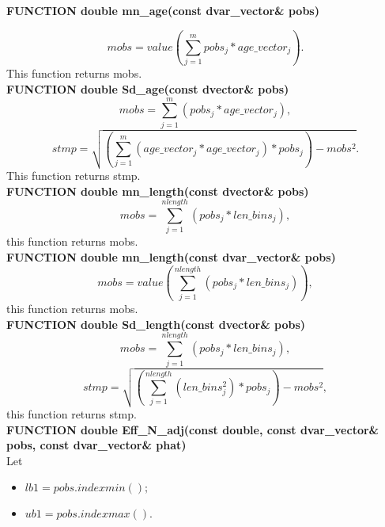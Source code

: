 \documentclass{article}
\begin{document}
\textbf{FUNCTION double mn\_age(const dvar\_vector\& pobs)}

\begin{equation}
    mobs = value\left(\sum_{j=1}^m pobs_j*age\_vector_j\right).
\end{equation}
This function returns mobs.\\

\textbf{FUNCTION double Sd\_age(const dvector\& pobs)}\\
\begin{equation}
    mobs = \sum_{j=1}^m(pobs_j*age\_vector_j),
\end{equation}
\begin{equation}
    stmp = \sqrt{\left(\sum_{j=1}^m(age\_vector_j*age\_vector_j)*pobs_j\right) - mobs^2}.
\end{equation}
This function returns stmp.\\
\textbf{FUNCTION double mn\_length(const dvector\& pobs)}\\
\begin{equation}
    mobs = \sum_{j=1}^{nlength}(pobs_j*len\_bins_j),
\end{equation}
this function returns mobs.\\
\textbf{FUNCTION double mn\_length(const dvar\_vector\& pobs)}\\
\begin{equation}
    mobs = value\left(\sum_{j=1}^{nlength}(pobs_j*len\_bins_j)\right),
\end{equation}
this function returns mobs.\\

\textbf{FUNCTION double Sd\_length(const dvector\& pobs)}\\
\begin{equation}
    mobs = \sum_{j=1}^{nlength}(pobs_j*len\_bins_j),
\end{equation}
\begin{equation}
    stmp = \sqrt{\left(\sum_{j=1}^{nlength}(len\_bins_j^2)*pobs_j\right) - mobs^2},
\end{equation}
this function returns stmp.\\

\textbf{FUNCTION double Eff\_N\_adj(const double, const dvar\_vector\& pobs, const dvar\_vector\& phat)}\\
Let
\begin{itemize}
    \item $lb1 = pobs.indexmin();$
    \item $ub1 = pobs.indexmax().$
\end{itemize}
\end{document}
